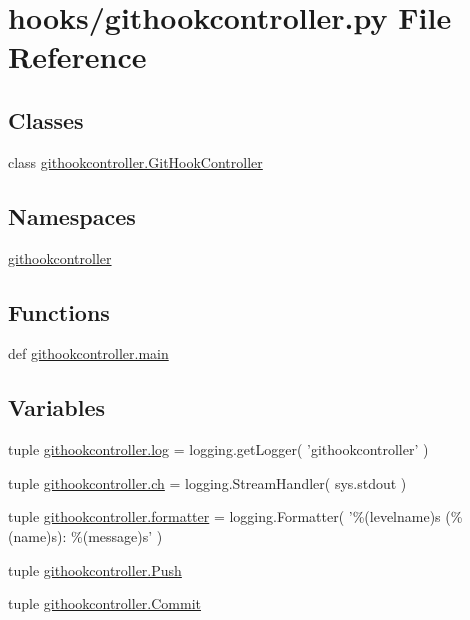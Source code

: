 \section{hooks/githookcontroller.py File Reference}
\label{githookcontroller_8py}
\subsection*{Classes}
\begin{DoxyCompactItemize}
\item 
class \hyperlink{classgithookcontroller_1_1GitHookController}{githookcontroller.\-Git\-Hook\-Controller}
\end{DoxyCompactItemize}
\subsection*{Namespaces}
\begin{DoxyCompactItemize}
\item 
\hyperlink{namespacegithookcontroller}{githookcontroller}
\end{DoxyCompactItemize}
\subsection*{Functions}
\begin{DoxyCompactItemize}
\item 
def \hyperlink{namespacegithookcontroller_a5c0a2facfdd7509f64df2aa6aefecf17}{githookcontroller.\-main}
\end{DoxyCompactItemize}
\subsection*{Variables}
\begin{DoxyCompactItemize}
\item 
tuple \hyperlink{namespacegithookcontroller_a3bbdf7a562461bd3baca4ef635d6dd50}{githookcontroller.\-log} = logging.\-get\-Logger( 'githookcontroller' )
\item 
tuple \hyperlink{namespacegithookcontroller_a13f0aa9843a2a5b05ba2e12f5ed3c903}{githookcontroller.\-ch} = logging.\-Stream\-Handler( sys.\-stdout )
\item 
tuple \hyperlink{namespacegithookcontroller_a8672f684f117c8c4733546a0bc9e9616}{githookcontroller.\-formatter} = logging.\-Formatter( '\%(levelname)s (\%(name)s)\-: \%(message)s' )
\item 
tuple \hyperlink{namespacegithookcontroller_ae617d8e0c886ed4e082bd11f1f33bd0d}{githookcontroller.\-Push}
\item 
tuple \hyperlink{namespacegithookcontroller_af0d83e4b5f26b63a7ee452f3eb566ef4}{githookcontroller.\-Commit}
\end{DoxyCompactItemize}
